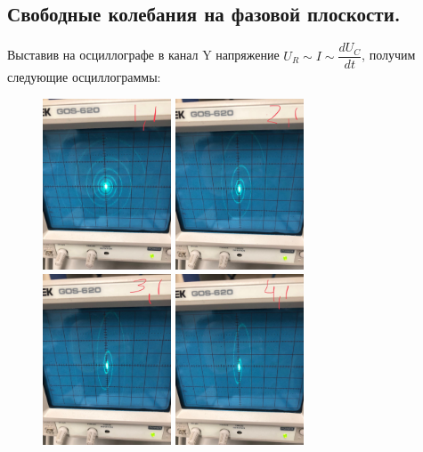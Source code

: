 \documentclass[a4paper, 12pt]{article}%
\begin{document}
\subsection*{Свободные колебания на фазовой плоскости.}
\begin{center}
Выставив на осциллографе в канал Y напряжение $U_{R} \sim I \sim \dfrac{dU_{C}}{dt}$, получим следующие осциллограммы:
\begin{figure}[h!]
\begin{center}
\includegraphics[width = 0.34\textwidth]{11.jpeg}
\includegraphics[width = 0.34\textwidth]{21.jpeg}
\includegraphics[width = 0.34\textwidth]{31.jpeg}
\includegraphics[width = 0.34\textwidth]{41.jpeg}
\end{center}
\end{figure}
\end{center}
\end{document}
